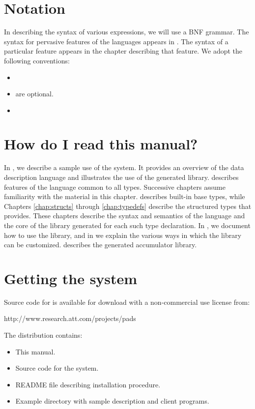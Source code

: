 \section{Notation}
In describing the syntax of various \PADSL{} expressions, we will use
a BNF grammar.  The syntax for pervasive features of the languages
appears in .  The syntax of a particular
feature appears in the chapter describing that feature.
We adopt the following conventions:
\begin{itemize}
\item {}
\item {} are optional.
\item {}

\end{itemize}

\section{How do I read this manual?}
In , we describe a sample use of the \PADS{}
system. It provides an overview of the data description language and
illustrates the use of the generated library.
 describes features of the \PADS{}
language common to all \padsl{} types.  Successive chapters assume
familiarity with the material in this chapter.
 describes built-in \padsl{} base types, while
Chapters \ref{chap:structs} through \ref{chap:typedefs} describe the
structured types that \padsl{} provides. These chapters describe the
syntax and semantics of the \pads{} language and the core of the
library generated for each such type declaration.
In , we document how to use the \pads{}
library, and in  we explain the various
ways in which the \pads{} library can be customized. 
 describes the generated accumulator
library.


\section{Getting the \PADS{} system}
Source code for \PADS{} is available for download with
a non-commercial use license from: 
\begin{centercode}
http://www.research.att.com/projects/pads
\end{centercode}
\noindent
The \PADS{} distribution contains:
\begin{itemize}
\item This manual.
\item Source code for the \pads{} system.
\item README file describing installation procedure.
\item Example directory with sample \PADS{} description and client programs.
\end{itemize}

